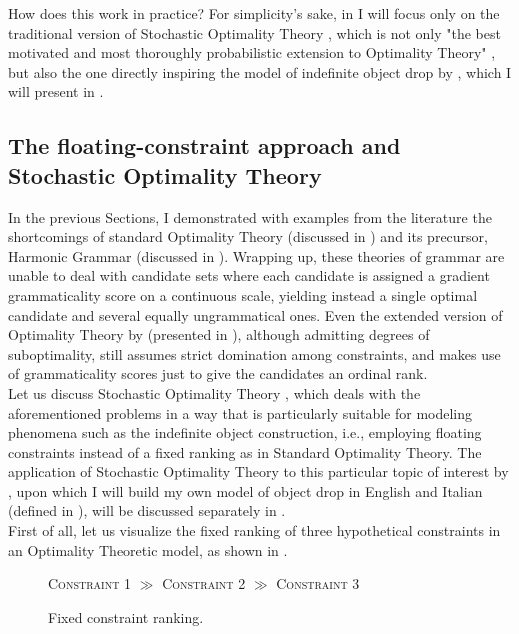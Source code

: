 How does this work in practice? For simplicity's sake, in  I will focus only on the traditional version of Stochastic Optimality Theory \parencite{boersma1997we, BoersmaHayes2001empirical}, which is not only "the best motivated and most thoroughly probabilistic extension to Optimality Theory" \parencite[25]{manning2003probabilistic}, but also the one directly inspiring the model of indefinite object drop by \textcite{Medina2007}, which I will present in .


\subsection{The floating-constraint approach and Stochastic Optimality Theory}  %

In the previous Sections, I demonstrated with examples from the literature the shortcomings of standard Optimality Theory (discussed in ) and its precursor, Harmonic Grammar (discussed in ). Wrapping up, these theories of grammar are unable to deal with candidate sets where each candidate is assigned a gradient grammaticality score on a continuous scale, yielding instead a single optimal candidate and several equally ungrammatical ones. Even the extended version of Optimality Theory by \textcite{keller1997extraction} (presented in ), although admitting degrees of suboptimality, still assumes strict domination among constraints, and makes use of grammaticality scores just to give the candidates an ordinal rank.\\
Let us discuss Stochastic Optimality Theory \parencite{BoersmaHayes2001empirical, boersma1997we}, which deals with the aforementioned problems in a way that is particularly suitable for modeling phenomena such as the indefinite object construction, i.e., employing floating constraints instead of a fixed ranking as in Standard Optimality Theory. The application of Stochastic Optimality Theory to this particular topic of interest by \textcite{Medina2007}, upon which I will build my own model of object drop in English and Italian (defined in ), will be discussed separately in .\\
First of all, let us visualize the fixed ranking of three hypothetical constraints in an Optimality Theoretic model, as shown in . 

\begin{figure}[htb]
\caption{Fixed constraint ranking.}
\textsc{Constraint 1} $\gg$ \textsc{Constraint 2} $\gg$ \textsc{Constraint 3}
\end{figure}

